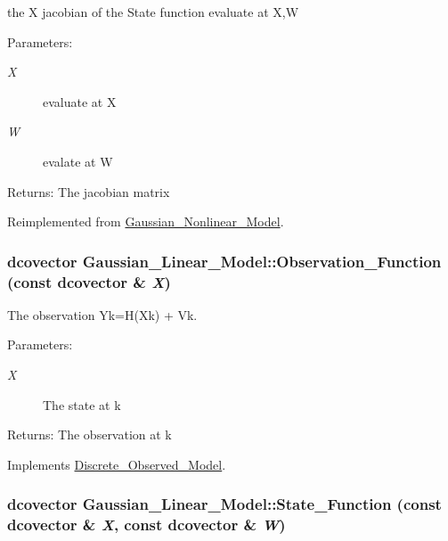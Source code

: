 the X jacobian of the State function evaluate at X,W 

\begin{Desc}
\item[Parameters:]
\begin{description}
\item[{\em X}]evaluate at X \item[{\em W}]evalate at W\end{description}
\end{Desc}
\begin{Desc}
\item[Returns:]The jacobian matrix \end{Desc}


Reimplemented from \hyperlink{class_gaussian___nonlinear___model_ad4a587fcaab06d2d9e44d61cee814cf}{Gaussian\_\-Nonlinear\_\-Model}.\hypertarget{class_gaussian___linear___model_a6ac01291543509b33bad1160ad7e498}{
\subsubsection[{Observation\_\-Function}]{\setlength{\rightskip}{0pt plus 5cm}dcovector Gaussian\_\-Linear\_\-Model::Observation\_\-Function (const dcovector \& {\em X})}}
\label{class_gaussian___linear___model_a6ac01291543509b33bad1160ad7e498}


The observation Yk=H(Xk) + Vk. 

\begin{Desc}
\item[Parameters:]
\begin{description}
\item[{\em X}]The state at k\end{description}
\end{Desc}
\begin{Desc}
\item[Returns:]The observation at k \end{Desc}


Implements \hyperlink{class_discrete___observed___model_8d56d86ea6b204672c8ebd720f1e11a6}{Discrete\_\-Observed\_\-Model}.\hypertarget{class_gaussian___linear___model_f0d24016df8709697480126c240a16ba}{
\subsubsection[{State\_\-Function}]{\setlength{\rightskip}{0pt plus 5cm}dcovector Gaussian\_\-Linear\_\-Model::State\_\-Function (const dcovector \& {\em X}, \/  const dcovector \& {\em W})}}
\label{class_gaussian___linear___model_f0d24016df8709697480126c240a16ba}


